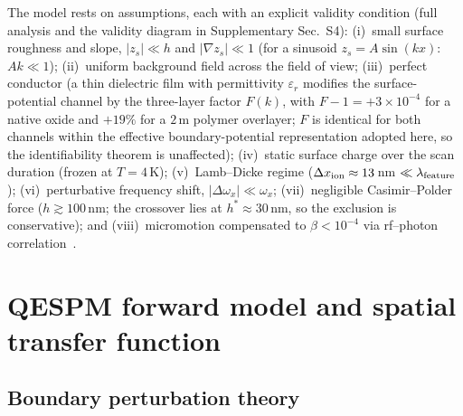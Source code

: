\documentclass[12pt,a4paper]{article}
\begin{document}
The model rests on assumptions, each with an explicit validity condition
(full analysis and the validity diagram in Supplementary Sec.~S4):
(i)~small surface roughness and slope, $|z_s|\ll h$ and $|\nabla z_s|\ll1$
(for a sinusoid $z_s=A\sin(kx)$: $Ak\ll1$); (ii)~uniform background field
across the field of view; (iii)~perfect conductor (a thin dielectric film with permittivity
$\varepsilon_r$ modifies the surface-potential channel by the
three-layer factor $F(k)$, with $F-1=+3\times10^{-4}$ for a native
oxide and $+19\%$ for a $2$\,\textmu m polymer overlayer; $F$ is
identical for both channels within the effective boundary-potential
representation adopted here, so the identifiability theorem is
unaffected);
(iv)~static surface charge over the scan duration (frozen at $T=4$\,K);
(v)~Lamb--Dicke regime ($\Delta x_{\rm ion}\approx13$\,nm $\ll
\lambda_{\rm feature}$);
(vi)~perturbative frequency shift, $|\Delta\omega_x|\ll\omega_x$;
(vii)~negligible Casimir--Polder force ($h\gtrsim100$\,nm; the crossover
lies at $h^*\approx30$\,nm, so the exclusion is conservative); and
(viii)~micromotion compensated to
$\beta<10^{-4}$ via rf--photon correlation~\cite{berkeland1998}.

\section{QESPM forward model and spatial transfer function}
\label{sec:forward}

\subsection{Boundary perturbation theory}
\end{document}
